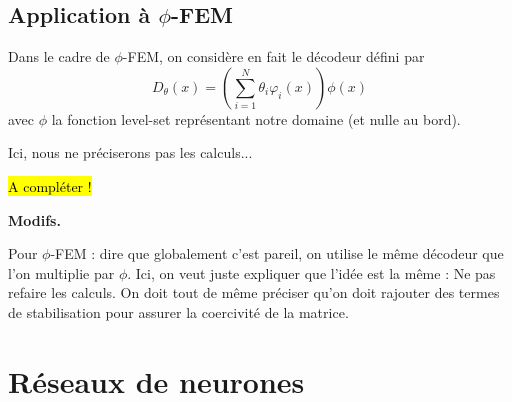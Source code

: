\documentclass[french]{article}
\begin{document}
	\subsection{Application à $\phi$-FEM}
	
	Dans le cadre de $\phi$-FEM, on considère en fait le décodeur défini par
	\begin{equation*}
		D_\theta(x) = \left(\sum_{i=1}^N \theta_i \varphi_i(x)\right)\phi(x)
	\end{equation*}
	avec $\phi$ la fonction level-set représentant notre domaine (et nulle au bord).
	
	Ici, nous ne préciserons pas les calculs...
	
	\hl{A compléter !}
	
	\begin{tcolorbox}[
		colback=white, %
		colframe=red!70!black, %
		arc=2mm, %
		boxrule=1pt, %
		breakable, enhanced jigsaw
		]
		\textcolor{red!70!black}{\textbf{Modifs.} \\}
		
		Pour $\phi$-FEM : dire que globalement c'est pareil, on utilise le même décodeur que l'on multiplie par $\phi$. Ici, on veut juste expliquer que l'idée est la même : Ne pas refaire les calculs. On doit tout de même préciser qu'on doit rajouter des termes de stabilisation pour assurer la coercivité de la matrice.
	\end{tcolorbox}

	\section{Réseaux de neurones}
\end{document}
